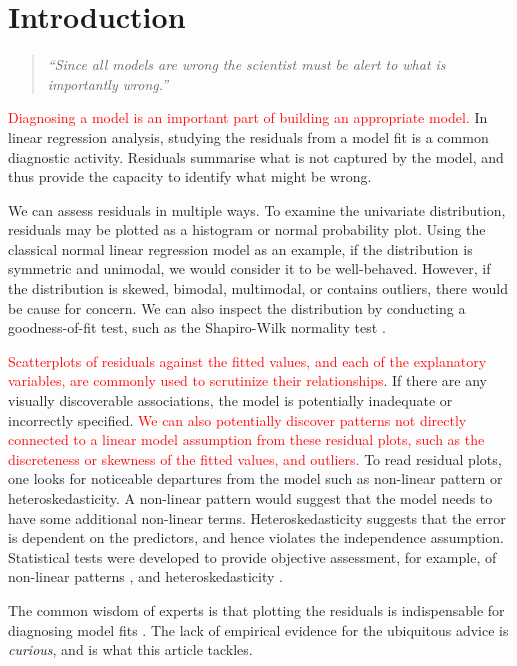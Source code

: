 \documentclass[]{interact}
\theoremstyle{plain}%
\theoremstyle{definition}
\theoremstyle{remark}
\begin{document}
\hypertarget{introduction}{%
\section{Introduction}\label{introduction}}

\begin{quote}
\emph{``Since all models are wrong the scientist must be alert to what
is importantly wrong.''} \citep{box1976science}
\end{quote}

\textcolor{red}{Diagnosing a model is an important part of building an appropriate model.}
In linear regression analysis, studying the residuals from a model fit
is a common diagnostic activity. Residuals summarise what is not
captured by the model, and thus provide the capacity to identify what
might be wrong.

We can assess residuals in multiple ways. To examine the univariate
distribution, residuals may be plotted as a histogram or normal
probability plot. Using the classical normal linear regression model as
an example, if the distribution is symmetric and unimodal, we would
consider it to be well-behaved. However, if the distribution is skewed,
bimodal, multimodal, or contains outliers, there would be cause for
concern. We can also inspect the distribution by conducting a
goodness-of-fit test, such as the Shapiro-Wilk normality test
\citep{shapiro1965analysis}.

\textcolor{red}{Scatterplots of residuals against the fitted values, and each of the explanatory variables, are commonly used to scrutinize their relationships}.
If there are any visually discoverable associations, the model is
potentially inadequate or incorrectly specified.
\textcolor{red}{We can also potentially discover patterns not directly connected to a linear model assumption from these residual plots, such as the discreteness or skewness of the fitted values, and outliers.}
To read residual plots, one looks for noticeable departures from the
model such as non-linear pattern or heteroskedasticity. A non-linear
pattern would suggest that the model needs to have some additional
non-linear terms. Heteroskedasticity suggests that the error is
dependent on the predictors, and hence violates the independence
assumption. Statistical tests were developed to provide objective
assessment, for example, of non-linear patterns
\citep[e.g.][]{ramsey1969tests}, and heteroskedasticity
\citep[e.g.][]{breusch1979simple}.

The common wisdom of experts is that plotting the residuals is
indispensable for diagnosing model fits
\citep{draper1998applied, cook1982residuals, montgomery1982introduction}.
The lack of empirical evidence for the ubiquitous advice is
\emph{curious}, and is what this article tackles.
\end{document}
